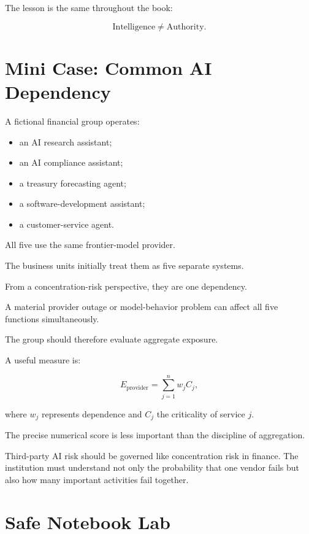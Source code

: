 The lesson is the same throughout the book:

\begin{equation}
\text{Intelligence}
\neq
\text{Authority}.
\end{equation}

\section{Mini Case: Common AI Dependency}

A fictional financial group operates:

\begin{itemize}
    \item an AI research assistant;
    \item an AI compliance assistant;
    \item a treasury forecasting agent;
    \item a software-development assistant;
    \item a customer-service agent.
\end{itemize}

All five use the same frontier-model provider.

The business units initially treat them as five separate systems.

From a concentration-risk perspective, they are one dependency.

A material provider outage or model-behavior problem can affect all five functions simultaneously.

The group should therefore evaluate aggregate exposure.

A useful measure is:

\begin{equation}
E_{\text{provider}}
=
\sum_{j=1}^{n}
w_j C_j,
\end{equation}

where \(w_j\) represents dependence and \(C_j\) the criticality of service \(j\).

The precise numerical score is less important than the discipline of aggregation.

\begin{risklens}
Third-party AI risk should be governed like concentration risk in finance. The institution must understand not only the probability that one vendor fails but also how many important activities fail together.
\end{risklens}

\section{Safe Notebook Lab}


